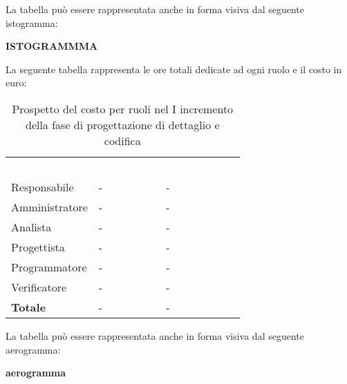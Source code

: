 La tabella può essere rappresentata anche in forma visiva dal seguente istogramma:

\textbf{ISTOGRAMMMA}


La seguente tabella rappresenta le ore totali dedicate ad ogni ruolo e il costo in euro:

\begin{table}[!htbp]
\begin{center}
\renewcommand{\arraystretch}{1.5}
\begin{tabular}{ m{}<{\centering}  m{}<{\centering} m{}<{\centering}}
	\rowcolor{darkblue}
	\textcolor{white}{\textbf{Ruolo}}&\textcolor{white}{\textbf{Totale ore}}&\textcolor{white}{\textbf{Costo totale}}\\ 

	Responsabile  & - & - \\	

	Amministratore & - & - \\
	
	Analista & - & - \\
	
	Progettista & - & - \\
	
	Programmatore & - & - \\
	
	Verificatore & - & - \\
	
	\textbf{Totale} & - & - \\
	
\end{tabular}
\caption{Prospetto del costo per ruoli nel I incremento della fase di progettazione di dettaglio e codifica}
\end{center}
\end{table}

La tabella può essere rappresentata anche in forma visiva dal seguente aerogramma:

\textbf{aerogramma}


